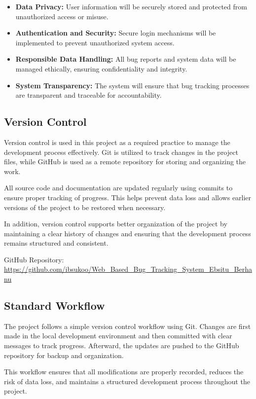\documentclass[12pt]{article}
\begin{document}
\begin{itemize}
    \item \textbf{Data Privacy:} User information will be securely stored and protected from unauthorized access or misuse.
    
    \item \textbf{Authentication and Security:} Secure login mechanisms will be implemented to prevent unauthorized system access.
    
    \item \textbf{Responsible Data Handling:} All bug reports and system data will be managed ethically, ensuring confidentiality and integrity.
    
    \item \textbf{System Transparency:} The system will ensure that bug tracking processes are transparent and traceable for accountability.
\end{itemize}
\subsection{Version Control}

Version control is used in this project as a required practice to manage the development process effectively. Git is utilized to track changes in the project files, while GitHub is used as a remote repository for storing and organizing the work.

All source code and documentation are updated regularly using commits to ensure proper tracking of progress. This helps prevent data loss and allows earlier versions of the project to be restored when necessary.

In addition, version control supports better organization of the project by maintaining a clear history of changes and ensuring that the development process remains structured and consistent.

GitHub Repository:
\url{https://github.com/ibsukoo/Web_Based_Bug_Tracking_System_Ebsitu_Berhanu}
\subsection{Standard Workflow}

The project follows a simple version control workflow using Git. Changes are first made in the local development environment and then committed with clear messages to track progress. Afterward, the updates are pushed to the GitHub repository for backup and organization.

This workflow ensures that all modifications are properly recorded, reduces the risk of data loss, and maintains a structured development process throughout the project.
\newpage


\end{document}
